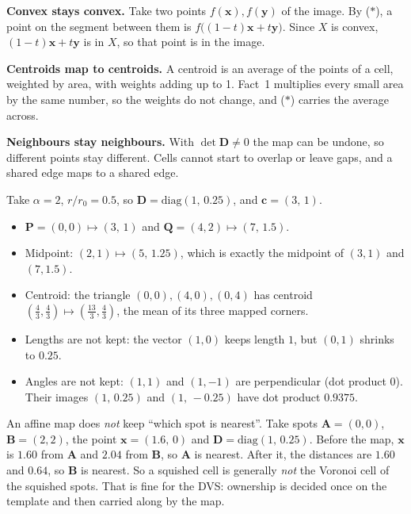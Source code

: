 \documentclass[11pt,a4paper]{article}
\newcommand{\vect}[1]{\mathbf{#1}}
\begin{document}
\begin{whybox}
\textbf{Convex stays convex.} Take two points $f(\vect{x}),f(\vect{y})$ of the image. By ($\ast$), a point on
the segment between them is $f\big((1-t)\vect{x}+t\vect{y}\big)$. Since $X$ is convex, $(1-t)\vect{x}+t\vect{y}$ is in
$X$, so that point is in the image.

\textbf{Centroids map to centroids.} A centroid is an average of the points of a cell, weighted by area, with weights
adding up to 1. Fact~1 multiplies every small area by the same number, so the weights do not change, and
($\ast$) carries the average across.

\textbf{Neighbours stay neighbours.} With $\det\vect{D}\ne0$ the map can be undone, so different points stay different.
Cells cannot start to overlap or leave gaps, and a shared edge maps to a shared edge.
\end{whybox}

\begin{examplebox}
Take $\alpha=2$, $r/r_0=0.5$, so $\vect{D}=\mathrm{diag}(1,\,0.25)$, and $\vect{c}=(3,\,1)$.
\begin{itemize}[leftmargin=*]
\item $\vect{P}=(0,0)\mapsto(3,\,1)$ and $\vect{Q}=(4,2)\mapsto(7,\,1.5)$.
\item Midpoint: $(2,1)\mapsto(5,\,1.25)$, which is exactly the midpoint of $(3,1)$ and $(7,1.5)$.
\item Centroid: the triangle $(0,0),(4,0),(0,4)$ has centroid $(\tfrac43,\tfrac43)\mapsto(\tfrac{13}{3},\tfrac43)$, the
mean of its three mapped corners.
\item Lengths are not kept: the vector $(1,0)$ keeps length $1$, but $(0,1)$ shrinks to $0.25$.
\item Angles are not kept: $(1,1)$ and $(1,-1)$ are perpendicular (dot product $0$). Their images $(1,\,0.25)$ and
$(1,\,-0.25)$ have dot product $0.9375$.
\end{itemize}
\end{examplebox}

\begin{watchbox}
An affine map does \emph{not} keep ``which spot is nearest''. Take spots $\vect{A}=(0,0)$, $\vect{B}=(2,2)$, the point
$\vect{x}=(1.6,\,0)$ and $\vect{D}=\mathrm{diag}(1,\,0.25)$. Before the map, $\vect{x}$ is $1.60$ from $\vect{A}$ and
$2.04$ from $\vect{B}$, so $\vect{A}$ is nearest. After it, the distances are $1.60$ and $0.64$, so $\vect{B}$ is
nearest. So a squished cell is generally \emph{not} the Voronoi cell of the squished spots. That is fine for the DVS:
ownership is decided once on the template and then carried along by the map.
\end{watchbox}
\end{document}
